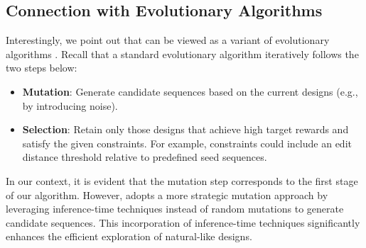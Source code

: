{
\subsection{Connection with Evolutionary Algorithms}

Interestingly, we point out that  can be viewed as a variant of evolutionary algorithms \citep{branke2008multiobjective}. Recall that a standard evolutionary algorithm iteratively follows the two steps below:
\begin{itemize}
    \item \textbf{Mutation}: Generate candidate sequences based on the current designs (e.g., by introducing noise). 
    \item \textbf{Selection}:  Retain only those designs that achieve high target rewards and satisfy the given constraints. For example, constraints could include an edit distance threshold relative to predefined seed sequences.
\end{itemize}

In our context, it is evident that the mutation step corresponds to the first stage of our algorithm. However,  adopts a more strategic mutation approach by leveraging inference-time techniques instead of random mutations to generate candidate sequences. This incorporation of inference-time techniques significantly enhances the efficient exploration of natural-like designs. 


} 